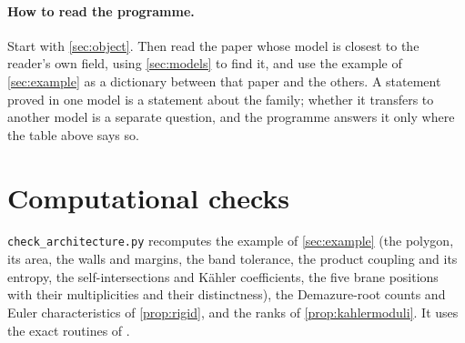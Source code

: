 \documentclass[11pt]{article}
\theoremstyle{definition}
\theoremstyle{remark}
\begin{document}
\paragraph{How to read the programme.} Start with \cref{sec:object}. Then read the paper whose model is closest to the reader's own
field, using \cref{sec:models} to find it, and use the example of \cref{sec:example} as a dictionary between that paper and the others. A
statement proved in one model is a statement about the family; whether it transfers to another model is a separate question, and the
programme answers it only where the table above says so.

\section{Computational checks}\label{sec:code}

\texttt{check\_architecture.py} recomputes the example of \cref{sec:example} (the polygon, its area, the walls and margins, the band
tolerance, the product coupling and its entropy, the self-intersections and Kähler coefficients, the five brane positions with their
multiplicities and their distinctness), the Demazure-root counts and Euler characteristics of \cref{prop:rigid}, and the ranks of
\cref{prop:kahlermoduli}. It uses the exact routines of \cite[\S8]{Bridges}.
\end{document}
